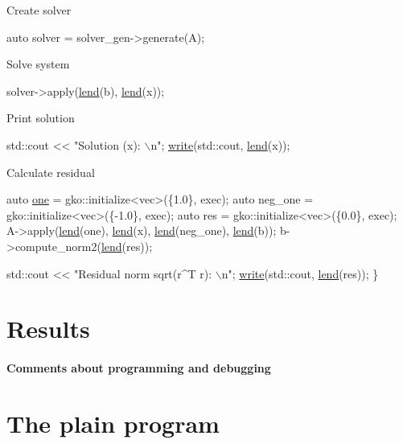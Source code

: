 Create solver


\begin{DoxyCode}
\textcolor{keyword}{auto} solver = solver\_gen->generate(A);
\end{DoxyCode}


Solve system


\begin{DoxyCode}
solver->apply(\hyperlink{namespacegko_aa8cb4876b72e5e1036ea9575443c439b}{lend}(b), \hyperlink{namespacegko_aa8cb4876b72e5e1036ea9575443c439b}{lend}(x));
\end{DoxyCode}


Print solution


\begin{DoxyCode}
std::cout << \textcolor{stringliteral}{"Solution (x): \(\backslash\)n"};
\hyperlink{namespacegko_a859dc47a462721d83728d91ab7fa2148}{write}(std::cout, \hyperlink{namespacegko_aa8cb4876b72e5e1036ea9575443c439b}{lend}(x));
\end{DoxyCode}


Calculate residual


\begin{DoxyCode}
    \textcolor{keyword}{auto} \hyperlink{namespacegko_a0059e27f8f4bc348ff65c1e60caf47c8}{one} = gko::initialize<vec>(\{1.0\}, exec);
    \textcolor{keyword}{auto} neg\_one = gko::initialize<vec>(\{-1.0\}, exec);
    \textcolor{keyword}{auto} res = gko::initialize<vec>(\{0.0\}, exec);
    A->apply(\hyperlink{namespacegko_aa8cb4876b72e5e1036ea9575443c439b}{lend}(one), \hyperlink{namespacegko_aa8cb4876b72e5e1036ea9575443c439b}{lend}(x), \hyperlink{namespacegko_aa8cb4876b72e5e1036ea9575443c439b}{lend}(neg\_one), \hyperlink{namespacegko_aa8cb4876b72e5e1036ea9575443c439b}{lend}(b));
    b->compute\_norm2(\hyperlink{namespacegko_aa8cb4876b72e5e1036ea9575443c439b}{lend}(res));

    std::cout << \textcolor{stringliteral}{"Residual norm sqrt(r^T r): \(\backslash\)n"};
    \hyperlink{namespacegko_a859dc47a462721d83728d91ab7fa2148}{write}(std::cout, \hyperlink{namespacegko_aa8cb4876b72e5e1036ea9575443c439b}{lend}(res));
\}
\end{DoxyCode}
 \label{_Results}%
\section*{Results}

\label{_Commentsaboutprogramminganddebugging}%
\paragraph*{Comments about programming and debugging }

\label{_PlainProg}%
 \section*{The plain program}


\begin{DoxyCodeInclude}
\end{DoxyCodeInclude}
 